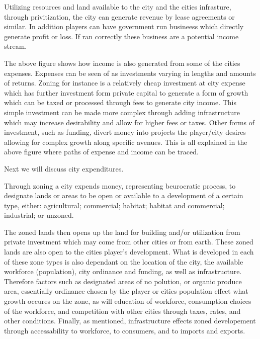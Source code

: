 Utilizing resources and land available to the city and the cities infrasture, through privitization, the city can generate revenue by lease agreements or similar. In addition players can have government run busineess which directly generate profit or loss. If ran correctly these business are a potential income stream. 




The above figure shows how income is also generated from some of the cities expenses. Expenses can be seen of as investments varying in lengths and amounts of returns. Zoning for instance is a relatively cheap investment at city expense which has further investment form private capital to generate a form of growth which can be taxed or processed through fees to generate city income. This simple investment can be made more complex through adding infrastructure which may increase desirability and allow for higher fees or taxes. Other forms of investment, such as funding, divert money into projects the player/city desires allowing for complex growth along specific avenues. This is all explained in the above figure where paths of expense and income can be traced.

Next we will discuss city expenditures.

Through zoning a city expends money, representing beurocratic process, to designate lands or areas to be open or available to a development of a certain type, either: agricultural; commercial; habitat; habitat and commercial; industrial; or unzoned.

The zoned lands then opens up the land for building and/or utilization from private investment which may come from other cities or from earth. These zoned lands are also open to the cities player's development. 
What is developed in each of these zone types is also dependant on the location of the city, the available workforce (population), city ordinance and funding, as well as infrastructure. Therefore factors such as designated areas of no polution, or organic produce area, essentially ordinance chosen by the player or cities population effect what growth occures on the zone, as will education of workforce, consumption choices of the workforce, and competition with other cities through taxes, rates, and other conditions. Finally, as mentioned, infrastructure effects zoned developement through accessability to workforce, to consumers, and to imports and exports.



